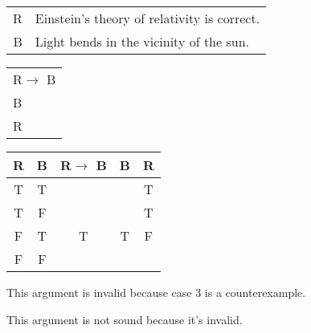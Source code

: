 \section{}
\centering
\begin{tabular}{r l}
    R & Einstein's theory of relativity is correct. \\
    B & Light bends in the vicinity of the sun.
\end{tabular}
\begin{tabular}{l}
    R$\rightarrow$ B\\
    B\\
    \hline
    R
\end{tabular}

\begin{tabular}{c|c||c|c||c}
    R & B & R$\rightarrow$ B & B & R \\
    \hline
    T & T &   &   & T \\
    T & F &   &   & T \\
    F & T & T & T & F \\
    F & F &   &   &  
\end{tabular}

\justifying
\noindent This argument is invalid because case 3 is a counterexample.

\noindent This argument is not sound because it's invalid.